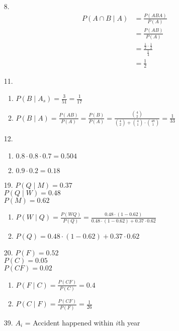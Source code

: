 \documentclass{article}
\begin{document}
\begin{itemize}
\item [8.]
  \begin{equation*}
    \begin{split}
      P(A \cap B \mid A)
      &= \frac{P(ABA)}{P(A)}\\
      &= \frac{P(AB)}{P(A)}\\
      &= \frac{\frac{1}{2}\cdot \frac{1}{2}}{\frac{1}{4}}\\
      &= \frac{1}{2}
    \end{split}
  \end{equation*}
\item [11.]
  \begin{enumerate}[label=(\alph*)]
  \item \(P(B \mid A_s) = \frac{3}{51} = \frac{1}{17}\)
  \item \(P(B \mid A) = \frac{P(AB)}{P(A)} = \frac{P(B)}{P(A)} = \frac{{4 \choose 2}}{{4 \choose 2} + {4 \choose 1} \cdot {48 \choose 1}} = \frac{1}{33}\)
  \end{enumerate}
\item [12.]
  \begin{enumerate}[label=(\alph*)]
  \item $0.8 \cdot 0.8 \cdot 0.7 = 0.504$
  \item $0.9 \cdot 0.2 = 0.18$
  \end{enumerate}
\item [19.]
  $P(Q \mid M) = 0.37$\\
  $P(Q \mid W) = 0.48$\\
  $P(M) = 0.62$
  \begin{enumerate}[label=(\alph*)]
  \item $P(W \mid Q) = \frac{P(WQ)}{P(Q)} = \frac{0.48 \cdot (1-0.62)}{0.48 \cdot (1-0.62) + 0.37 \cdot 0.62}$
  \item $P(Q) = 0.48 \cdot (1-0.62) + 0.37 \cdot 0.62$
  \end{enumerate}
\item [20.]
  $P(F) = 0.52$\\
  $P(C) = 0.05$\\
  $P(CF) = 0.02$
  \begin{enumerate}[label=(\alph*)]
  \item $P(F \mid C) = \frac{P(CF)}{P(C)} = 0.4$
  \item $P(C \mid F) = \frac{P(CF)}{P(F)} = \frac{1}{26}$
  \end{enumerate}
\item [39.]
  $A_i$ = Accident happened within $i$th year\\

\end{itemize}
\end{document}
